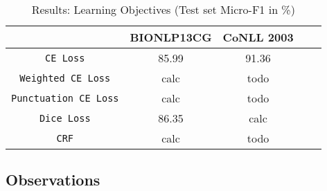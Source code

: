 \begin{table}[h!]
\centering
\begin{tabular}{|c|c|c|c|c|}\hline
	\textbf{} & \textbf{BIONLP13CG} & \textbf{CoNLL 2003}\\\hline
	\texttt{CE Loss} & 85.99 & 91.36\\\hline
	\texttt{Weighted CE Loss} & calc & todo\\\hline
	\texttt{Punctuation CE Loss} & calc & todo\\\hline
	\texttt{Dice Loss} & 86.35 & calc\\\hline
	\texttt{CRF} & calc & todo\\\hline
	\end{tabular}
    \caption{Results: Learning Objectives (Test set Micro-F1 in \%)}
    \label{tab:res_loss}
\end{table}

\subsection{Observations}

